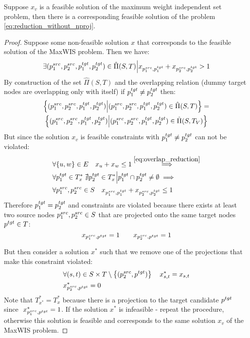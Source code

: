\begin{lemma} \label{lemma:app_maxis_f_implies_ilp}
  Suppose \( x_v \) is a feasible solution of the maximum weight independent set problem, then there is a
  corresponding feasible solution of the problem \eqref{eq:reduction_without_nproj}.
\end{lemma}
\begin{proof}
  Suppose some non-feasible solution \( x \) that corresponds to the feasible solution of the
  MaxWIS problem. Then we have:
  \[
    \exists (p_1^{src}, p_2^{src}, p_1^{tgt}, p_2^{tgt}) \in \hat{\Pi}(S, T) \Big|
    x_{p_1^{src}, p_1^{tgt}} + x_{p_2^{src}, p_2^{tgt}} > 1
  \]
  By construction of the set \( \hat{\Pi}(S, T) \) and the overlapping relation (dummy target nodes
  are overlapping only with itself) if \( p_1^{tgt} \neq p_2^{tgt} \) then:
  \begin{multline*}
    \left\{ (p_1^{src}, p_2^{src}, p_1^{tgt}, p_2^{tgt}) \Big| (p_1^{src}, p_2^{src}, p_1^{tgt}, p_2^{tgt}) \in \hat{\Pi}(S, T) \right\} = \\
    \left\{ (p_1^{src}, p_2^{src}, p_1^{tgt}, p_2^{tgt}) \Big| (p_1^{src}, p_2^{src}, p_1^{tgt}, p_2^{tgt}) \in \hat{\Pi}(S, T_V) \right\}
  \end{multline*}
  But since the solution \( x_v \) is feasible constraints with  \( p_1^{tgt} \neq p_2^{tgt} \) can not be violated:
  \begin{align*}
    & \forall \{ u, w \} \in E \quad x_u + x_w \leq 1 \stackrel{\eqref{eq:overlap_reduction}}{\implies}                  \\
    & \forall p_1^{tgt} \in T^*_x \; \nexists p_2^{tgt} \in T^*_x \Big| p_1^{tgt} \cap p_2^{tgt} \neq \emptyset \implies \\
    & \forall p_1^{src}, p_2^{src} \in S \quad x_{p_1^{src}, p_1^{tgt}} + x_{p_2^{src}, p_2^{tgt}} \leq 1
  \end{align*}
  Therefore \( p_1^{tgt} = p_2^{tgt} \) and constraints are violated because there exists
  at least two source nodes \( p_1^{src}, p_2^{src} \in S \) that are projected onto the same target nodes \( p^{tgt} \in T \):
  \[
    x_{p_1^{src}, p^{tgt}} = 1 \qquad x_{p_2^{src}, p^{tgt}} = 1
  \]

  But then consider a solution \( x^* \) such that we remove one of the projections that
  make this constraint violated:
  \begin{align*}
    & \forall (s,t) \in S \times T \setminus \left\{ (p_2^{src}, p^{tgt}) \right\}
    \quad x^*_{s,t} = x_{s,t} \\
    & x^*_{p_2^{src}, p^{tgt}} = 0
  \end{align*}
  Note that \( T^*_{x^*} = T^*_x  \) because there is a projection to the target candidate \( p^{tgt} \)
  since \( \)  \( x^*_{p_1^{src}, p^{tgt}} = 1 \).
  If the solution \( x^* \) is infeasible - repeat the procedure, otherwise
  this solution is feasible and corresponds to the same solution \( x_v \) of the MaxWIS problem.
\end{proof}

